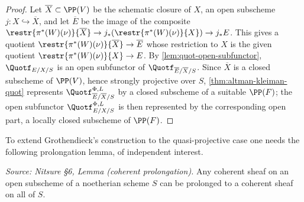 \begin{proof}
  Let $\overline X\subset \PP(V)$ be the schematic closure of $X$, an open
  subscheme $j\colon X\hookrightarrow \overline X$, and let $\overline E$ be the
  image of the composite
  $\restr{\pi^*(W)(\nu)}{\overline X}\to j_*(\restr{\pi^*(W)(\nu)}{X})\to j_*E$.
  This gives a quotient $\restr{\pi^*(W)(\nu)}{\overline X}\to \overline E$ whose
  restriction to $X$ is the given quotient $\restr{\pi^*(W)(\nu)}{X}\to E$. By
  \cref{lem:quot-open-subfunctor}, $\Quotf_{E/X/S}$ is an open subfunctor of
  $\Quotf_{\overline E/\overline X/S}$. Since $\overline X$ is a closed subscheme
  of $\PP(V)$, hence strongly projective over $S$, \cref{thm:altman-kleiman-quot}
  represents $\Quotf_{\overline E/\overline X/S}^{\Phi,L}$ by a closed subscheme
  of a suitable $\PP(F)$; the open subfunctor $\Quotf_{E/X/S}^{\Phi,L}$ is then
  represented by the corresponding open part, a locally closed subscheme of
  $\PP(F)$.
\end{proof}

To extend Grothendieck's construction to the quasi-projective case one needs the
following prolongation lemma, of independent interest.

\begin{lemma}
  \label{lem:coherent-prolongation}
  \textit{Source: Nitsure §6, Lemma (coherent prolongation).}
  Any coherent sheaf on an open subscheme of a noetherian scheme $S$ can be
  prolonged to a coherent sheaf on all of $S$.
\end{lemma}

